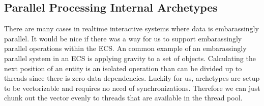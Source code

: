 \subsection{Parallel Processing Internal Archetypes}
There are many cases in realtime interactive systems where data is embarassingly parallel. It would be nice if there was a way for us to support embarassingly parallel operations within the ECS. An common example of an embarassingly parallel system in an ECS is applying gravity to a set of objects. Calculating the next position of an entity is an isolated operation than can be divided up to threads since there is zero data dependencies. Luckily for us, archetypes are setup to be vectorizable and requires no need of synchronizations. Therefore we can just chunk out the vector evenly to threads that are available in the thread pool.